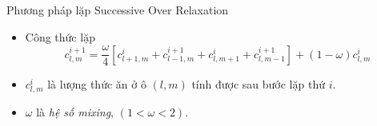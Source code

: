 \begin{frame}{Phương pháp lặp Successive Over Relaxation}
\begin{itemize}
    \item Công thức lặp
    \begin{equation}
    	c^{i + 1}_{l, m} = \frac{\omega}{4}[c^{i}_{l + 1, m} + c^{i + 1}_{l - 1, m} + c^{i}_{l, m + 1} + c^{i + 1}_{l, m - 1}] + (1 - \omega)c^{i}_{l, m}
	\end{equation}
	\item $c^{i}_{l, m}$ là lượng thức ăn ở ô $(l, m)$ tính được sau bước lặp thứ $i$.
	\item $\omega$ là \emph{hệ số mixing}, $(1 < \omega < 2)$.
\end{itemize}
\end{frame}